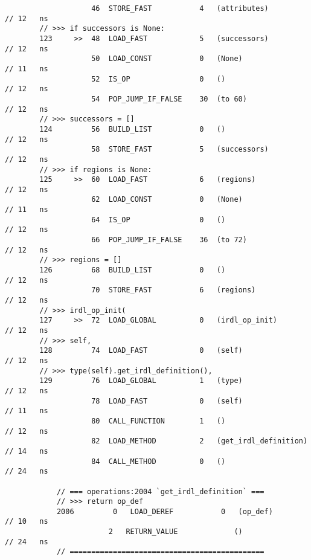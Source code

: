 \begin{code}
\begin{verbatim}
                    46  STORE_FAST           4   (attributes)                               // 12   ns
        // >>> if successors is None:
        123     >>  48  LOAD_FAST            5   (successors)                               // 12   ns
                    50  LOAD_CONST           0   (None)                                     // 11   ns
                    52  IS_OP                0   ()                                         // 12   ns
                    54  POP_JUMP_IF_FALSE    30  (to 60)                                    // 12   ns
        // >>> successors = []
        124         56  BUILD_LIST           0   ()                                         // 12   ns
                    58  STORE_FAST           5   (successors)                               // 12   ns
        // >>> if regions is None:
        125     >>  60  LOAD_FAST            6   (regions)                                  // 12   ns
                    62  LOAD_CONST           0   (None)                                     // 11   ns
                    64  IS_OP                0   ()                                         // 12   ns
                    66  POP_JUMP_IF_FALSE    36  (to 72)                                    // 12   ns
        // >>> regions = []
        126         68  BUILD_LIST           0   ()                                         // 12   ns
                    70  STORE_FAST           6   (regions)                                  // 12   ns
        // >>> irdl_op_init(
        127     >>  72  LOAD_GLOBAL          0   (irdl_op_init)                             // 12   ns
        // >>> self,
        128         74  LOAD_FAST            0   (self)                                     // 12   ns
        // >>> type(self).get_irdl_definition(),
        129         76  LOAD_GLOBAL          1   (type)                                     // 12   ns
                    78  LOAD_FAST            0   (self)                                     // 11   ns
                    80  CALL_FUNCTION        1   ()                                         // 12   ns
                    82  LOAD_METHOD          2   (get_irdl_definition)                      // 14   ns
                    84  CALL_METHOD          0   ()                                         // 24   ns

            // === operations:2004 `get_irdl_definition` ===
            // >>> return op_def
            2006         0   LOAD_DEREF           0   (op_def)                              // 10   ns
                        2   RETURN_VALUE             ()                                     // 24   ns
            // =============================================


\end{verbatim}
\end{code}
